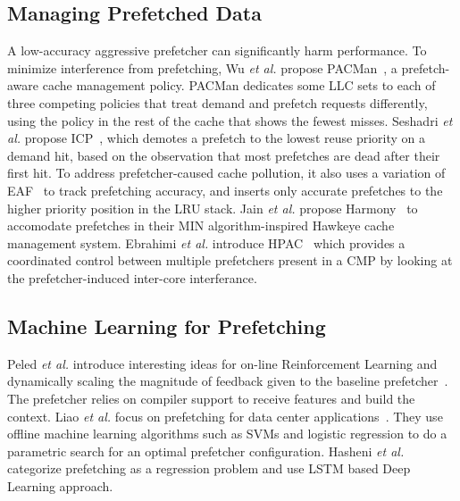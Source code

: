 
\subsection{Managing Prefetched Data}


A low-accuracy aggressive prefetcher can significantly harm
performance.  To minimize interference from prefetching, Wu \textit{et
  al.} propose PACMan~\cite{pacman}, a prefetch-aware cache management
policy. PACMan dedicates some LLC sets to each of three competing
policies that treat demand and prefetch requests differently, using
the policy in the rest of the cache that shows the fewest
misses. Seshadri \textit{et al.} propose ICP~\cite{icp}, which demotes
a prefetch to the lowest reuse priority on a demand hit, based on the
observation that most prefetches are dead after their first hit. To
address prefetcher-caused cache pollution, it also uses a variation of
EAF~\cite{eaf} to track prefetching accuracy, and inserts only
accurate prefetches to the higher priority position in the LRU
stack. Jain \textit{et al.} propose Harmony~\cite{Harmony} to
accomodate prefetches in their MIN algorithm-inspired Hawkeye cache
management system. Ebrahimi \textit{et al.} introduce
HPAC~\cite{HPAC} which provides a coordinated control between 
multiple prefetchers present in a CMP by looking at the 
prefetcher-induced inter-core interferance.

\subsection{Machine Learning for Prefetching}

Peled \textit{et al.} introduce interesting ideas for on-line
Reinforcement Learning and dynamically scaling the magnitude of
feedback given to the baseline prefetcher~\cite{Semantics}. The
prefetcher relies on compiler support to receive features and build
the context.  Liao \textit{et al.}  focus on prefetching for data
center applications~\cite{Datacenter}.  They use offline machine
learning algorithms such as SVMs and logistic regression to do a
parametric search for an optimal prefetcher configuration. 
Hasheni \textit{et al.}~\cite{LSTM} categorize 
prefetching as a regression problem and use LSTM based Deep 
Learning approach.
